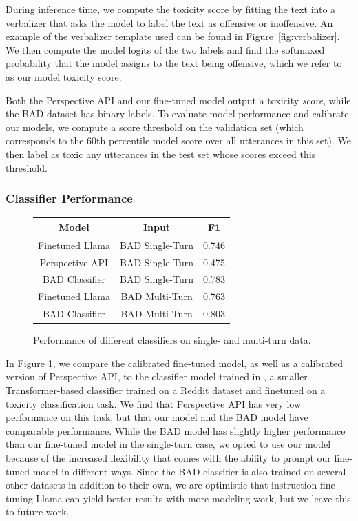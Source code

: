 During inference time, we compute the toxicity score by fitting the text into a verbalizer that asks the model to label the text as offensive or inoffensive. An example of the verbalizer template used can be found in Figure~\ref{fig:verbalizer}.  We then compute the model logits of the two labels and find the softmaxed probability that the model assigns to the text being offensive, which we refer to as our model toxicity score.

Both the Perspective API and our fine-tuned model output a toxicity \textit{score}, while the BAD dataset has binary labels. To evaluate model performance and calibrate our models, we compute a score threshold on the validation set (which corresponds to the 60th percentile model score over all utterances in this set). We then label as toxic any utterances in the test set whose scores exceed this threshold.

\subsubsection{Classifier Performance}

\begin{figure}
    \begin{tabular}{|c|c|c|}
        \hline
        \textbf{Model} & \textbf{Input} & \textbf{F1} \\\hline
         Finetuned Llama & BAD Single-Turn & 0.746 \\
         Perspective API & BAD Single-Turn & 0.475 \\
         BAD Classifier & BAD Single-Turn & 0.783 \\\hline
         Finetuned Llama & BAD Multi-Turn & 0.763 \\
         BAD Classifier & BAD Multi-Turn & 0.803 \\\hline
    \end{tabular}
    \caption{Performance of different classifiers on single- and multi-turn data.}
    \label{fig:classifiers}
\end{figure}

In Figure \ref{fig:classifiers}, we compare the calibrated fine-tuned model, as well as a calibrated version of Perspective API, to the classifier model trained in \citet{bad-dataset}, a smaller Transformer-based classifier trained on a Reddit dataset and finetuned on a toxicity classification task. We find that Perspective API has very low performance on this task, but that our model and the BAD model have comparable performance. While the BAD model has slightly higher performance than our fine-tuned model in the single-turn case, we opted to use our model because of the increased flexibility that comes with the ability to prompt our fine-tuned model in different ways. Since the BAD classifier is also trained on several other datasets in addition to their own, we are optimistic that instruction fine-tuning Llama can yield better results with more modeling work, but we leave this to future work.

